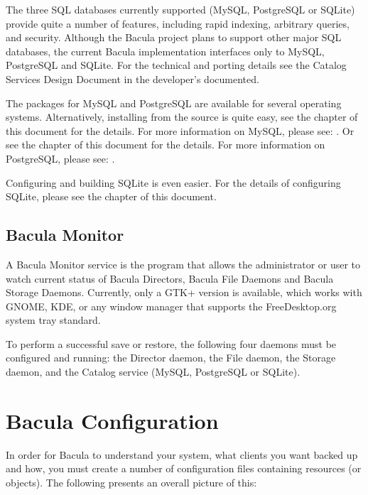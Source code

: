    The three SQL databases currently supported (MySQL, PostgreSQL or
   SQLite) provide quite a number of features, including rapid indexing,
   arbitrary queries, and security.  Although the Bacula project plans to support other
   major SQL databases, the current Bacula implementation interfaces only
   to MySQL, PostgreSQL and SQLite.  For the technical and porting details
   see the Catalog Services Design Document in the developer's documented.

   The packages for MySQL and PostgreSQL are available for several operating
   systems.
   Alternatively, installing from the
   source is quite easy, see the  chapter of this document for the details.  For
   more information on MySQL, please see:
   .  Or see the  chapter of this
   document for the details.  For more information on PostgreSQL, please
   see: .

   Configuring and building SQLite is even easier.  For the details of
   configuring SQLite, please see the  chapter of this document.

\subsection*{Bacula Monitor} 
   \label{MonDef}
   A Bacula Monitor service is the program that allows the
   administrator or user to watch current status of Bacula Directors,
   Bacula File Daemons and Bacula Storage Daemons.
   Currently, only a GTK+ version is available, which works with GNOME,
   KDE, or any window manager that supports the FreeDesktop.org system tray
   standard. 

   To perform a successful save or restore, the following four daemons must be
   configured and running: the Director daemon, the File daemon, the Storage
   daemon, and the Catalog service (MySQL, PostgreSQL or SQLite). 

\section{Bacula Configuration}

In order for Bacula to understand your system, what clients you want backed
up and how, you must create a number of configuration files containing
resources (or objects). The following presents an overall picture of this: 

